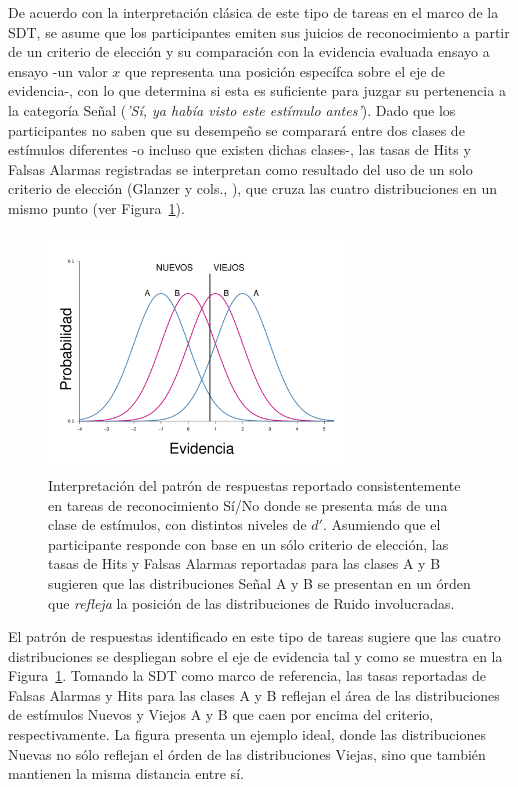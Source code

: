 \begin{itemize}
De acuerdo con la interpretación clásica de este tipo de tareas en el marco de la SDT, se asume que los participantes emiten sus juicios de reconocimiento a partir de un criterio de elección y su comparación con la evidencia evaluada ensayo a ensayo -un valor $x$ que representa una posición específca sobre el eje de evidencia-, con lo que determina si esta es suficiente para juzgar su pertenencia a la categoría Señal (\textit{'Sí, ya había visto este estímulo antes'}). Dado que los participantes no saben que su desempeño se comparará entre dos clases de estímulos diferentes -o incluso que existen dichas clases-, las tasas de Hits y Falsas Alarmas registradas se interpretan como resultado del uso de un solo criterio de elección (Glanzer y cols., \citeyear{Glanzer1993}), que cruza las cuatro distribuciones en un mismo punto (ver Figura~\ref{fig:Ejem_Espejo_YesNo}).\\

\begin{figure}[th]
\centering
\includegraphics[width=0.7\textwidth]{Figures/EfectoEspejo_YesNo}
\caption[Representación gráfica del Efecto Espejo de acuerdo a los datos obtenidos en Tareas Sí/No]{Interpretación del patrón de respuestas reportado consistentemente en tareas de reconocimiento Sí/No donde se presenta más de una clase de estímulos, con distintos niveles de $d'$. Asumiendo que el participante responde con base en un sólo criterio de elección, las tasas de Hits y Falsas Alarmas reportadas para las clases A y B sugieren que las distribuciones Señal A y B se presentan en un órden que \textit{refleja} la posición de las distribuciones de Ruido involucradas.}
\label{fig:Ejem_Espejo_YesNo}
\end{figure}

El patrón de respuestas identificado en este tipo de tareas sugiere que las cuatro distribuciones se despliegan sobre el eje de evidencia tal y como se muestra en la Figura~\ref{fig:Ejem_Espejo_YesNo}. Tomando la SDT como marco de referencia, las tasas reportadas de Falsas Alarmas y Hits para las clases A y B reflejan el área de las distribuciones de estímulos Nuevos y Viejos A y B que caen por encima del criterio, respectivamente. La figura presenta un ejemplo ideal, donde las distribuciones Nuevas no sólo reflejan el órden de las distribuciones Viejas, sino que también mantienen la misma distancia entre sí.\\


\end{itemize}
